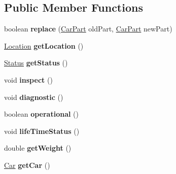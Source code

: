 \subsection*{Public Member Functions}
\begin{DoxyCompactItemize}
\item 
\hypertarget{classCars_1_1CarPart_acec30c01ebd3b7101b58134eda02a82c}{}boolean {\bfseries replace} (\hyperlink{classCars_1_1CarPart}{Car\+Part} old\+Part, \hyperlink{classCars_1_1CarPart}{Car\+Part} new\+Part)\label{classCars_1_1CarPart_acec30c01ebd3b7101b58134eda02a82c}

\item 
\hypertarget{classCars_1_1CarPart_a0a01ef76cb96674327f5709fa03a7ee7}{}\hyperlink{enumEnums_1_1Location}{Location} {\bfseries get\+Location} ()\label{classCars_1_1CarPart_a0a01ef76cb96674327f5709fa03a7ee7}

\item 
\hypertarget{classCars_1_1CarPart_aa042bb8f4a02ad6964bd70f1cc1a9c16}{}\hyperlink{enumEnums_1_1Status}{Status} {\bfseries get\+Status} ()\label{classCars_1_1CarPart_aa042bb8f4a02ad6964bd70f1cc1a9c16}

\item 
\hypertarget{classCars_1_1CarPart_a333807040e31fa3bdc186b21bbfbd219}{}void {\bfseries inspect} ()\label{classCars_1_1CarPart_a333807040e31fa3bdc186b21bbfbd219}

\item 
\hypertarget{classCars_1_1CarPart_a5dd0c890afe18965762a7a5c28c0bf4e}{}void {\bfseries diagnostic} ()\label{classCars_1_1CarPart_a5dd0c890afe18965762a7a5c28c0bf4e}

\item 
\hypertarget{classCars_1_1CarPart_a3aa4a7e089dd39c43e758b48a0f5f4fd}{}boolean {\bfseries operational} ()\label{classCars_1_1CarPart_a3aa4a7e089dd39c43e758b48a0f5f4fd}

\item 
\hypertarget{classCars_1_1CarPart_adf156fb8effd8e0d65704f61f90237d0}{}void {\bfseries life\+Time\+Status} ()\label{classCars_1_1CarPart_adf156fb8effd8e0d65704f61f90237d0}

\item 
\hypertarget{classCars_1_1CarPart_af8ff7d6936131b58164ba61ce26cd6b4}{}double {\bfseries get\+Weight} ()\label{classCars_1_1CarPart_af8ff7d6936131b58164ba61ce26cd6b4}

\item 
\hypertarget{classCars_1_1CarPart_ad3be05c274c4865eec7e376db6886670}{}\hyperlink{classCars_1_1Car}{Car} {\bfseries get\+Car} ()\label{classCars_1_1CarPart_ad3be05c274c4865eec7e376db6886670}


\end{DoxyCompactItemize}
